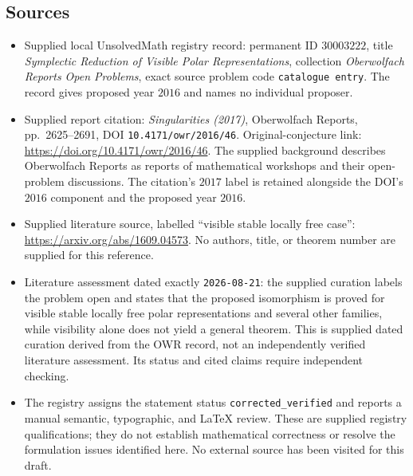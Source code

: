 \documentclass[11pt]{article}
\begin{document}
\subsection{Sources}
\begin{itemize}
\item Supplied local UnsolvedMath registry record: permanent ID \(30003222\), title \emph{Symplectic Reduction of Visible Polar Representations}, collection \emph{Oberwolfach Reports Open Problems}, exact source problem code \texttt{catalogue entry}. The record gives proposed year \(2016\) and names no individual proposer.
\item Supplied report citation: \emph{Singularities (2017)}, Oberwolfach Reports, pp.\ 2625--2691, DOI \texttt{10.4171/owr/2016/46}. Original-conjecture link: \url{https://doi.org/10.4171/owr/2016/46}. The supplied background describes Oberwolfach Reports as reports of mathematical workshops and their open-problem discussions. The citation's \(2017\) label is retained alongside the DOI's \(2016\) component and the proposed year \(2016\).
\item Supplied literature source, labelled ``visible stable locally free case'': \url{https://arxiv.org/abs/1609.04573}. No authors, title, or theorem number are supplied for this reference.
\item Literature assessment dated exactly \texttt{2026-08-21}: the supplied curation labels the problem open and states that the proposed isomorphism is proved for visible stable locally free polar representations and several other families, while visibility alone does not yield a general theorem. This is supplied dated curation derived from the OWR record, not an independently verified literature assessment. Its status and cited claims require independent checking.
\item The registry assigns the statement status \texttt{corrected\_verified} and reports a manual semantic, typographic, and LaTeX review. These are supplied registry qualifications; they do not establish mathematical correctness or resolve the formulation issues identified here. No external source has been visited for this draft.
\end{itemize}
\end{document}
